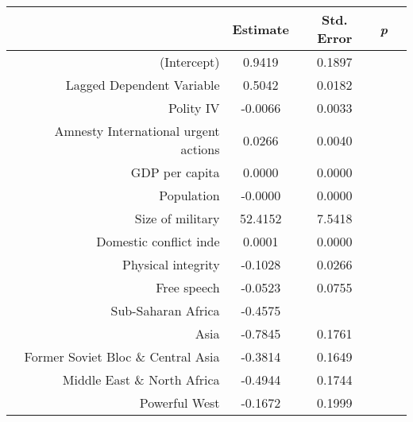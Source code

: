 \documentclass{article}
\begin{document}
\begin{table}[ht]
	\centering
	\begin{tabular}{rcccc}
		\hline
		& Estimate & Std. Error & \emph{p} \\ 
		\hline
		(Intercept) & 0.9419 & 0.1897 &  \textasteriskcentered\textasteriskcentered\textasteriskcentered \\ 
		Lagged Dependent Variable & 0.5042 & 0.0182 &  \textasteriskcentered\textasteriskcentered\textasteriskcentered \\ 
		Polity IV & -0.0066 & 0.0033 &  \textasteriskcentered \\ 
		Amnesty International urgent actions & 0.0266 & 0.0040 & \textasteriskcentered\textasteriskcentered\textasteriskcentered \\ 
		GDP per capita & 0.0000 & 0.0000 &   \\ 
		Population & -0.0000 & 0.0000 &   \\ 
		Size of military & 52.4152 & 7.5418 & \textasteriskcentered\textasteriskcentered\textasteriskcentered \\ 
		Domestic conflict inde & 0.0001 & 0.0000 &  \cdotp \\ 
		Physical integrity & -0.1028 & 0.0266 &  \textasteriskcentered\textasteriskcentered\textasteriskcentered \\ 
		Free speech & -0.0523 & 0.0755 &  \\ 
		Sub-Saharan Africa & -0.4575 & \cdotp &  \textasteriskcentered\textasteriskcentered\textasteriskcentered \\ 
		Asia & -0.7845 & 0.1761 &  \textasteriskcentered\textasteriskcentered\textasteriskcentered \\ 
		Former Soviet Bloc \& Central Asia & -0.3814 & 0.1649 &  \textasteriskcentered \\ 
		Middle East \& North Africa & -0.4944 & 0.1744 &  \textasteriskcentered\textasteriskcentered \\ 
		Powerful West & -0.1672 & 0.1999 &  \\ 
		\hline
	\end{tabular}
\end{table}
\end{document}
